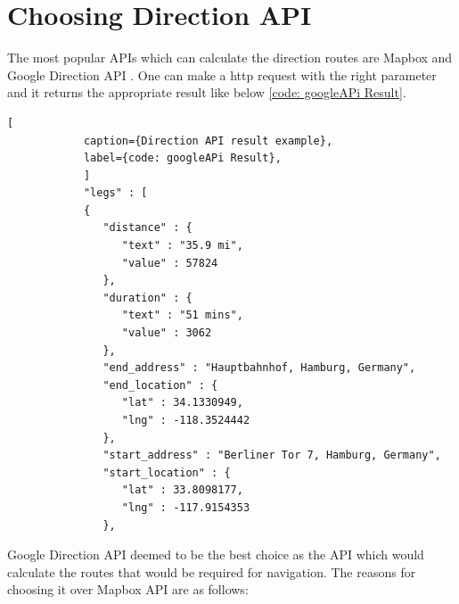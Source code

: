     \section{Choosing Direction API}  
        The most popular APIs which can calculate the direction routes are Mapbox \cite{mapbox} 
        and Google Direction API \cite{googleDirecAPI}. One can make a http request with the 
        right parameter and it returns the appropriate result like below \ref{code: googleAPi Result}.
        \begin{lstlisting}[
            caption={Direction API result example}, 
            label={code: googleAPi Result},
            ]
            "legs" : [
            {
               "distance" : {
                  "text" : "35.9 mi",
                  "value" : 57824
               },
               "duration" : {
                  "text" : "51 mins",
                  "value" : 3062
               },
               "end_address" : "Hauptbahnhof, Hamburg, Germany",
               "end_location" : {
                  "lat" : 34.1330949,
                  "lng" : -118.3524442
               },
               "start_address" : "Berliner Tor 7, Hamburg, Germany",
               "start_location" : {
                  "lat" : 33.8098177,
                  "lng" : -117.9154353
               },  
        \end{lstlisting}
    
        Google Direction API deemed to be the best choice as the API which
        would calculate the routes that would be required for navigation.
        The reasons for choosing it over Mapbox API are as follows:


